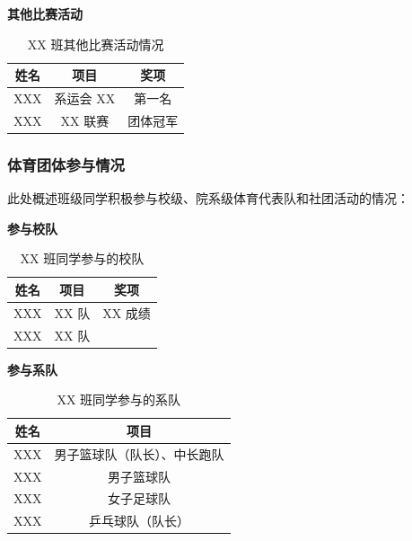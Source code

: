 
\textbf{其他比赛活动}

\begin{table}[H]
    \centering
    \begin{tabular}{||c|c|c||}
        \hline
        \hline
        姓名   & 项目       & 奖项     \\
        \hline
        XXX & 系运会 XX  & 第一名   \\
        \hline
        XXX & XX 联赛    & 团体冠军 \\
        \hline
        \hline
        \end{tabular}
    \caption{XX 班其他比赛活动情况}
\end{table}

\subsubsection{体育团体参与情况}

此处概述班级同学积极参与校级、院系级体育代表队和社团活动的情况：

\textbf{参与校队}

\begin{table}[H]
    \centering
    \begin{tabular}{||c|c|c||}
        \hline
        姓名   & 项目       & 奖项     \\
        \hline
        XXX & XX 队     & XX 成绩  \\
        XXX & XX 队     &          \\
        \hline
    \end{tabular}
    \caption{XX 班同学参与的校队}
\end{table}

\textbf{参与系队}

\begin{table}[H]
    \centering
    \begin{tabular}{||c|c||}
        \hline
        姓名   & 项目                         \\
        \hline
        XXX & 男子篮球队（队长）、中长跑队 \\
        XXX & 男子篮球队                   \\
        XXX & 女子足球队                   \\
        XXX & 乒乓球队（队长）             \\
        \hline
    \end{tabular}
    \caption{XX 班同学参与的系队}
\end{table}


